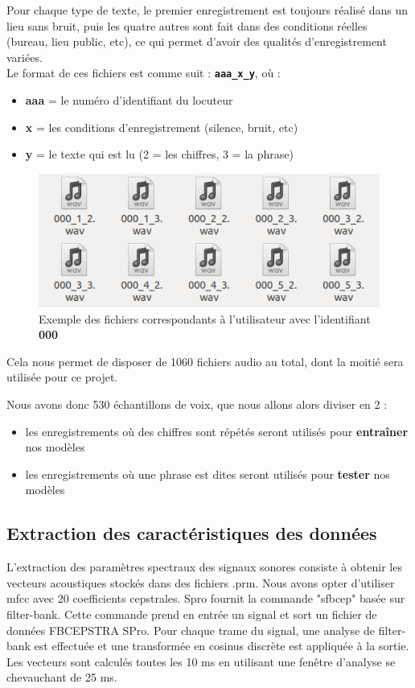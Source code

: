\documentclass[a4paper, 12pt]{book}
\begin{document}
Pour chaque type de texte, le premier enregistrement est toujours réalisé dans un lieu sans bruit, puis les quatre autres sont fait dans des conditions réelles (bureau, lieu public, etc), ce qui permet d'avoir des qualités d'enregistrement variées.\\

Le format de ces fichiers est comme suit : \textbf{\texttt{aaa\_x\_y}}, où :
\begin{itemize}
  \item \textbf{aaa} = le numéro d'identifiant du locuteur
  \item \textbf{x} = les conditions d'enregistrement (silence, bruit, etc)
  \item \textbf{y} = le texte qui est lu (2 = les chiffres, 3 = la phrase)
\end{itemize}

\begin{figure}[htbp]
  \centering
  \includegraphics[width=0.7\linewidth]{images/voiceSamples.png}
  \caption{Exemple des fichiers correspondants à l'utilisateur avec l'identifiant \textbf{000}}
\end{figure}

Cela nous permet de disposer de 1060 fichiers audio au total, dont la moitié sera utilisée pour ce projet.

Nous avons donc 530 échantillons de voix, que nous allons alors diviser en 2 :
\begin{itemize}
  \item les enregistrements où des chiffres sont répétés seront utilisés pour \textbf{entraîner} nos modèles
  \item les enregistrements où une phrase est dites seront utilisés pour \textbf{tester} nos modèles
\end{itemize}

\subsection{Extraction des caractéristiques des données}
L’extraction des paramètres spectraux des signaux sonores consiste à obtenir les vecteurs acoustiques stockés dans des fichiers .prm. Nous avons opter d'utiliser mfcc avec 20 coefficients cepstrales. Spro fournit la commande "sfbcep" basée sur filter-bank. Cette commande prend en entrée un signal et sort un fichier de données FBCEPSTRA SPro. Pour chaque trame du signal, une analyse de filter-bank est effectuée et une transformée en cosinus discrète est appliquée à la sortie. Les vecteurs  sont calculés toutes les 10 ms en utilisant une fenêtre d'analyse se chevauchant de 25 ms.
\end{document}

